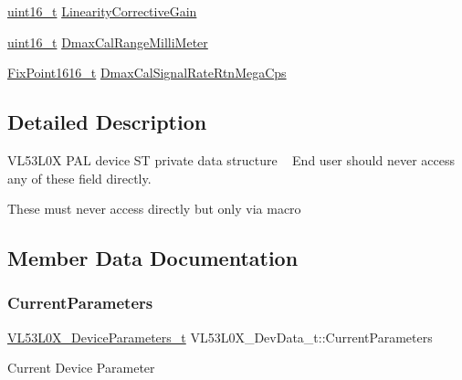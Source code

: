 \begin{DoxyCompactItemize}
\hyperlink{vl53l0x__types_8h_a273cf69d639a59973b6019625df33e30}{uint16\+\_\+t} \hyperlink{structVL53L0X__DevData__t_ac30c7ce4262f144af814f9665c0d1f60}{Linearity\+Corrective\+Gain}
\item 
\hyperlink{vl53l0x__types_8h_a273cf69d639a59973b6019625df33e30}{uint16\+\_\+t} \hyperlink{structVL53L0X__DevData__t_a25258ff806f25c9ea91012fd9b69dc46}{Dmax\+Cal\+Range\+Milli\+Meter}
\item 
\hyperlink{vl53l0x__types_8h_afb910790161809fc76e1a274a6349384}{Fix\+Point1616\+\_\+t} \hyperlink{structVL53L0X__DevData__t_a564bb3bd87e8950734a5d99d121313d0}{Dmax\+Cal\+Signal\+Rate\+Rtn\+Mega\+Cps}
\end{DoxyCompactItemize}


\subsection{Detailed Description}
V\+L53\+L0X P\+AL device ST private data structure ~\newline
End user should never access any of these field directly. 

These must never access directly but only via macro 

\subsection{Member Data Documentation}
\mbox{\label{structVL53L0X__DevData__t_a823d3a952c645f472c3130e7f956f0e1}} 
\subsubsection{\texorpdfstring{Current\+Parameters}{CurrentParameters}}
{\footnotesize\ttfamily \hyperlink{structVL53L0X__DeviceParameters__t}{V\+L53\+L0\+X\+\_\+\+Device\+Parameters\+\_\+t} V\+L53\+L0\+X\+\_\+\+Dev\+Data\+\_\+t\+::\+Current\+Parameters}

Current Device Parameter \mbox{\label{structVL53L0X__DevData__t_a0f50334a87083360b8c97073a4edd364}} 
